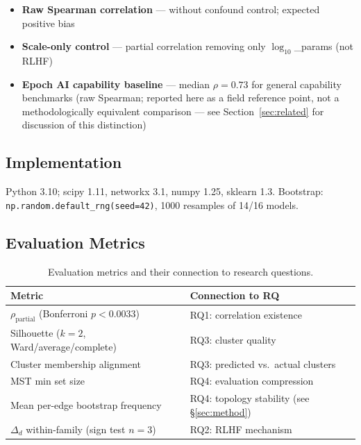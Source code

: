 \begin{itemize}
  \item \textbf{Raw Spearman correlation} --- without confound control; expected positive bias
  \item \textbf{Scale-only control} --- partial correlation removing only $\log_{10}$\_params (not RLHF)
  \item \textbf{Epoch AI capability baseline} \cite{epochai2024} --- median $\rho = 0.73$ for general capability benchmarks (raw Spearman; reported here as a field reference point, not a methodologically equivalent comparison --- see Section~\ref{sec:related} for discussion of this distinction)
\end{itemize}

\subsection{Implementation}

Python 3.10; scipy 1.11, networkx 3.1, numpy 1.25, sklearn 1.3. Bootstrap: \texttt{np.random.default\_rng(seed=42)}, 1000 resamples of 14/16 models.

\subsection{Evaluation Metrics}

\begin{table}[h]
\centering
\caption{Evaluation metrics and their connection to research questions.}
\label{tab:metrics}
\begin{tabular}{ll}
\toprule
\textbf{Metric} & \textbf{Connection to RQ} \\
\midrule
$\rho_\text{partial}$ (Bonferroni $p < 0.0033$) & RQ1: correlation existence \\
Silhouette ($k=2$, Ward/average/complete) & RQ3: cluster quality \\
Cluster membership alignment & RQ3: predicted vs.\ actual clusters \\
MST min set size & RQ4: evaluation compression \\
Mean per-edge bootstrap frequency & RQ4: topology stability (see \S\ref{sec:method}) \\
$\Delta_d$ within-family (sign test $n=3$) & RQ2: RLHF mechanism \\
\bottomrule
\end{tabular}
\end{table}
